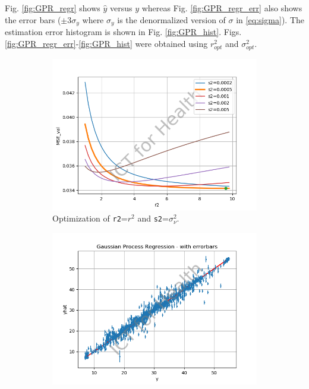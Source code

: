 \documentclass[12pt]{article}
\begin{document}
Fig. \ref{fig:GPR_regr} shows $\hat{y}$ versus $y$ whereas Fig. \ref{fig:GPR_regr_err} also shows the error bars ($\pm 3\sigma_y$ where $\sigma_y$ is the denormalized version of $\sigma$ in \eqref{eq:sigma}). The estimation error histogram is shown in Fig. \ref{fig:GPR_hist}. Figs. \ref{fig:GPR_regr_err}-\ref{fig:GPR_hist} were obtained using   $r^2_{opt}$ and  $\sigma^2_{opt}$.
\begin{figure}
\centering
\begin{subfigure}{0.45\textwidth}
\includegraphics[width=\textwidth]{optimization.png}  
\caption{Optimization of \texttt{r2}=$r^2$ and \texttt{s2}=$\sigma_\nu^2$.}
\label{fig:GPR_optim}
\end{subfigure}
\begin{subfigure}{0.45\textwidth}
\includegraphics[width=\textwidth]{GP_regression_errorbars.png}  

\end{subfigure}
\end{figure}
\end{document}
